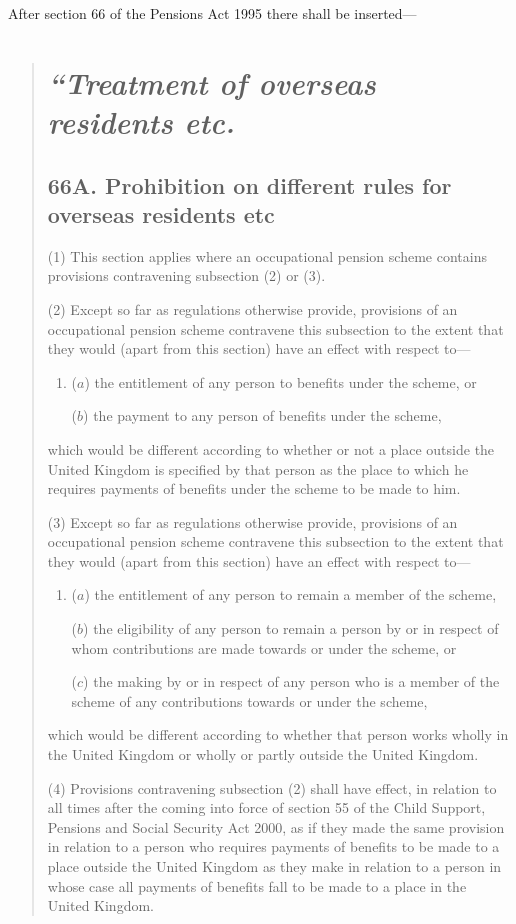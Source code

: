 \documentclass[12pt,a4paper]{article}
\begin{document}
After section 66 of the Pensions Act 1995 there shall be inserted—
\begin{quotation}
\section*{\itshape “Treatment of overseas residents etc.}

\subsection*{66A. Prohibition on different rules for overseas residents etc}

(1) This section applies where an occupational pension scheme contains provisions contravening subsection (2)  or (3).

(2) Except so far as regulations otherwise provide, provisions of an occupational pension scheme contravene this subsection to the extent that they would (apart from this section) have an effect with respect to—
\begin{enumerate}\item[]
($a$) the entitlement of any person to benefits under the scheme, or

($b$) the payment to any person of benefits under the scheme,
\end{enumerate}
which would be different according to whether or not a place outside the United Kingdom is specified by that person as the place to which he requires payments of benefits under the scheme to be made to him.

(3) Except so far as regulations otherwise provide, provisions of an occupational pension scheme contravene this subsection to the extent that they would (apart from this section) have an effect with respect to—
\begin{enumerate}\item[]
($a$) the entitlement of any person to remain a member of the scheme,

($b$) the eligibility of any person to remain a person by or in respect of whom contributions are made towards or under the scheme, or

($c$) the making by or in respect of any person who is a member of the scheme of any contributions towards or under the scheme,
\end{enumerate}
which would be different according to whether that person works wholly in the United Kingdom or wholly or partly outside the United Kingdom.

(4) Provisions contravening subsection (2)  shall have effect, in relation to all times after the coming into force of section 55 of the Child Support, Pensions and Social Security Act 2000, as if they made the same provision in relation to a person who requires payments of benefits to be made to a place outside the United Kingdom as they make in relation to a person in whose case all payments of benefits fall to be made to a place in the United Kingdom.


\end{quotation}
\end{document}

